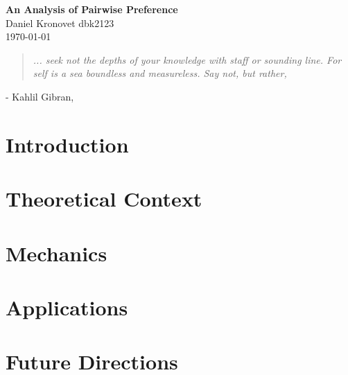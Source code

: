 \documentclass[12pt]{book}
\begin{document}
\begin{center}
  \Large \textbf{An Analysis of Pairwise Preference} \\
  \vspace{0.1in}
  \normalsize Daniel Kronovet dbk2123\\
  \today
\end{center}
  
\begin{center}  
\begin{quotation}
\textit{
	... seek not the depths of your knowledge with staff or sounding line.
	For self is a sea boundless and measureless.
	Say not,  but rather, 
	}
\end{quotation}
- Kahlil Gibran, \textit{} 
\end{center}

\section{Introduction}


\section{Theoretical Context}


\section{Mechanics}


\section{Applications}


\section{Future Directions}



\printbibliography
\end{document}
